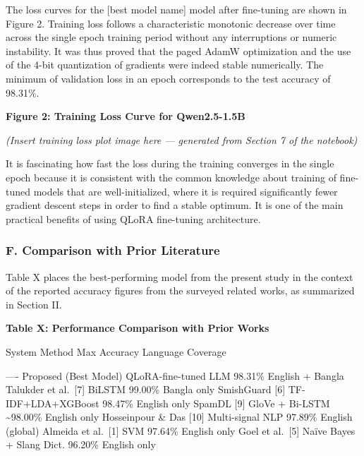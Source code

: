 The loss curves for the {[}best model name{]} model after fine-tuning
are shown in Figure 2. Training loss follows a characteristic monotonic
decrease over time across the single epoch training period without any
interruptions or numeric instability. It was thus proved that the paged
AdamW optimization and the use of the 4-bit quantization of gradients
were indeed stable numerically. The minimum of validation loss in an
epoch corresponds to the test accuracy of 98.31\%.

\textbf{Figure 2: Training Loss Curve for Qwen2.5-1.5B}

\emph{(Insert training loss plot image here --- generated from Section 7
of the notebook)}

It is fascinating how fast the loss during the training converges in the
single epoch because it is consistent with the common knowledge about
training of fine-tuned models that are well-initialized, where it is
required significantly fewer gradient descent steps in order to find a
stable optimum. It is one of the main practical benefits of using QLoRA
fine-tuning architecture.

\subsubsection{F. Comparison with Prior
Literature}\label{f.-comparison-with-prior-literature}

Table X places the best-performing model from the present study in the
context of the reported accuracy figures from the surveyed related
works, as summarized in Section II.

\textbf{Table X: Performance Comparison with Prior Works}

System \textbar{} Method \textbar{} Max Accuracy \textbar{} Language
Coverage \textbar{}

\textbar--\textbar--\textbar-\textbar\textbar{} \textbar{} Proposed
(Best Model) \textbar{} QLoRA-fine-tuned LLM \textbar{} 98.31\%
\textbar{} English + Bangla \textbar{} \textbar{} Talukder et
al.~{[}7{]} \textbar{} BiLSTM \textbar{} 99.00\% \textbar{} Bangla only
\textbar{} \textbar{} SmishGuard {[}6{]} \textbar{} TF-IDF+LDA+XGBoost
\textbar{} 98.47\% \textbar{} English only \textbar{} \textbar{} SpamDL
{[}9{]} \textbar{} GloVe + Bi-LSTM \textbar{} \textasciitilde98.00\%
\textbar{} English only \textbar{} \textbar{} Hosseinpour \& Das
{[}10{]} \textbar{} Multi-signal NLP \textbar{} 97.89\% \textbar{}
English (global) \textbar{} \textbar{} Almeida et al.~{[}1{]} \textbar{}
SVM \textbar{} 97.64\% \textbar{} English only \textbar{} \textbar{}
Goel et al.~{[}5{]} \textbar{} Naïve Bayes + Slang Dict. \textbar{}
96.20\% \textbar{} English only \textbar{}

